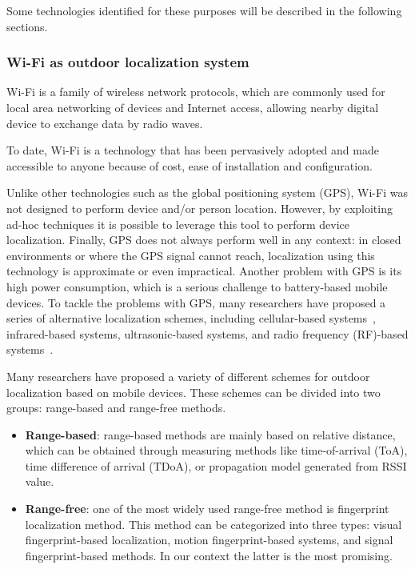 Some technologies identified for these purposes will be described in the following sections.

\subsubsection{Wi-Fi as outdoor localization system}\label{subsec:wi-fi-as-outdoor-localization-system}

Wi-Fi is a family of wireless network protocols, which are commonly used for local area networking of devices and Internet access, allowing nearby digital device to exchange data by radio waves.

To date, Wi-Fi is a technology that has been pervasively adopted and made accessible to anyone because of cost, ease of installation and configuration.

Unlike other technologies such as the global positioning system (GPS), Wi-Fi was not designed to perform device and/or person location.
However, by exploiting ad-hoc techniques it is possible to leverage this tool to perform device localization.
Finally, GPS does not always perform well in any context: in closed environments or where the GPS signal cannot reach, localization using
this technology is approximate or even impractical.
Another problem with GPS is its high power consumption, which is a serious challenge to battery-based mobile devices.
To tackle the problems with GPS, many researchers have proposed a series of alternative localization schemes, including cellular-based systems~\cite{ibrahim2010cellsense},
infrared-based systems, ultrasonic-based systems, and radio frequency (RF)-based systems~\cite{bahl2000radar, youssef2002probabilistic}.

Many researchers have proposed a variety of different schemes for outdoor localization based on mobile
devices.
These schemes can be divided into two groups: range-based and range-free methods.

\begin{itemize}
	\item \textbf{Range-based}: range-based methods are mainly based on relative distance, which can be obtained through measuring methods like time-of-arrival (ToA),
	      time difference of arrival (TDoA), or propagation model generated from RSSI value.
	\item \textbf{Range-free}: one of the most widely used range-free method is fingerprint localization method.
	      This method can be categorized into three types:
	      visual fingerprint-based localization, motion fingerprint-based systems, and signal fingerprint-based methods.
	      In our context the latter is the most promising.
\end{itemize}

